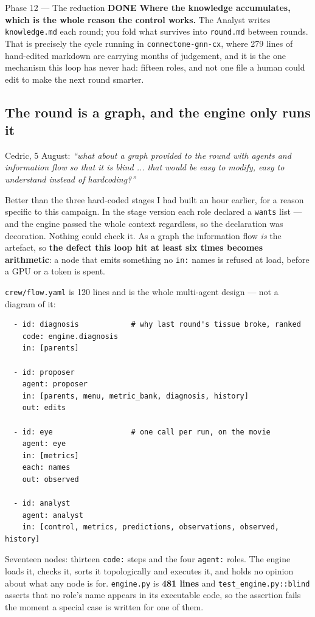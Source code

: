 \documentclass[11pt,a4paper]{article}
\newcommand{\code}[1]{\texttt{#1}}
\newcommand{\done}{\textcolor{good}{\textbf{DONE}}}
\begin{document}
\begin{phasebox}{Phase 12 --- The reduction \hfill \done}
\textbf{Where the knowledge accumulates, which is the whole reason the control works.} The Analyst
writes \code{knowledge.md} each round; you fold what survives into \code{round.md} between rounds.
That is precisely the cycle running in \code{connectome-gnn-cx}, where 279 lines of hand-edited
markdown are carrying months of judgement, and it is the one mechanism this loop has never had:
fifteen roles, and not one file a human could edit to make the next round smarter.

\subsection*{The round is a graph, and the engine only runs it}
Cedric, 5 August: \emph{``what about a graph provided to the round with agents and information flow so
that it is blind ... that would be easy to modify, easy to understand instead of hardcoding?''}

Better than the three hard-coded stages I had built an hour earlier, for a reason specific to this
campaign. In the stage version each role declared a \code{wants} list --- and the engine passed the
whole context regardless, so the declaration was decoration. Nothing could check it. As a graph the
information flow \emph{is} the artefact, so \textbf{the defect this loop hit at least six times
becomes arithmetic}: a node that emits something no \code{in:} names is refused at load, before a GPU
or a token is spent.

\code{crew/flow.yaml} is 120 lines and is the whole multi-agent design --- not a diagram of it:

\begin{verbatim}
  - id: diagnosis            # why last round's tissue broke, ranked
    code: engine.diagnosis
    in: [parents]

  - id: proposer
    agent: proposer
    in: [parents, menu, metric_bank, diagnosis, history]
    out: edits

  - id: eye                  # one call per run, on the movie
    agent: eye
    in: [metrics]
    each: names
    out: observed

  - id: analyst
    agent: analyst
    in: [control, metrics, predictions, observations, observed, history]
\end{verbatim}

\noindent Seventeen nodes: thirteen \code{code:} steps and the four \code{agent:} roles. The engine
loads it, checks it, sorts it topologically and executes it, and holds no opinion about what any node
is for. \code{engine.py} is \textbf{481 lines} and \code{test\_engine.py::blind} asserts that no
role's name appears in its executable code, so the assertion fails the moment a special case is
written for one of them.


\end{phasebox}
\end{document}

